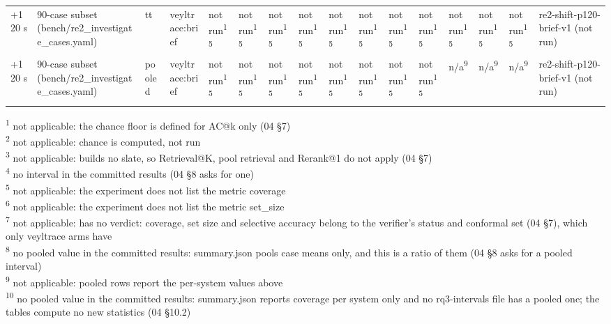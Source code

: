 \begin{table}[t]
\begin{tabular}{llllllllllllllll}
+120 s & 90-case subset (bench/re2\_investigate\_cases.yaml) & tt & veyltrace:brief & not run\textsuperscript{15} & not run\textsuperscript{15} & not run\textsuperscript{15} & not run\textsuperscript{15} & not run\textsuperscript{15} & not run\textsuperscript{15} & not run\textsuperscript{15} & not run\textsuperscript{15} & not run\textsuperscript{15} & not run\textsuperscript{15} & not run\textsuperscript{15} & re2-shift-p120-brief-v1 (not run) \\
+120 s & 90-case subset (bench/re2\_investigate\_cases.yaml) & pooled & veyltrace:brief & not run\textsuperscript{15} & not run\textsuperscript{15} & not run\textsuperscript{15} & not run\textsuperscript{15} & not run\textsuperscript{15} & not run\textsuperscript{15} & not run\textsuperscript{15} & not run\textsuperscript{15} & n/a\textsuperscript{9} & n/a\textsuperscript{9} & n/a\textsuperscript{9} & re2-shift-p120-brief-v1 (not run) \\
\hline
\end{tabular}
\par\smallskip\footnotesize
\textsuperscript{1} not applicable: the chance floor is defined for AC@k only (04 \S{}7)\\
\textsuperscript{2} not applicable: chance is computed, not run\\
\textsuperscript{3} not applicable: builds no slate, so Retrieval@K, pool retrieval and Rerank@1 do not apply (04 \S{}7)\\
\textsuperscript{4} no interval in the committed results (04 \S{}8 asks for one)\\
\textsuperscript{5} not applicable: the experiment does not list the metric coverage\\
\textsuperscript{6} not applicable: the experiment does not list the metric set\_size\\
\textsuperscript{7} not applicable: has no verdict: coverage, set size and selective accuracy belong to the verifier's status and conformal set (04 \S{}7), which only veyltrace arms have\\
\textsuperscript{8} no pooled value in the committed results: summary.json pools case means only, and this is a ratio of them (04 \S{}8 asks for a pooled interval)\\
\textsuperscript{9} not applicable: pooled rows report the per-system values above\\
\textsuperscript{10} no pooled value in the committed results: summary.json reports coverage per system only and no rq3-intervals file has a pooled one; the tables compute no new statistics (04 \S{}10.2)\\

\end{table}
